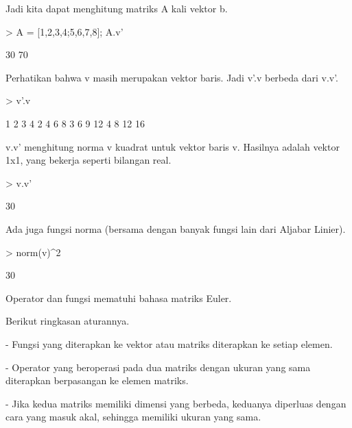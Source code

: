 \documentclass[a4paper,10pt]{article}
\begin{document}
\begin{eulernotebook}
\begin{eulercomment}
\begin{eulercomment}
\begin{eulercomment}
\begin{eulercomment}
\begin{eulercomment}
\begin{eulercomment}
\begin{eulercomment}
Jadi kita dapat menghitung matriks A kali vektor b.
\end{eulercomment}
\begin{eulerprompt}
> A = [1,2,3,4;5,6,7,8]; A.v'
\end{eulerprompt}
\begin{euleroutput}
             30 
             70 
\end{euleroutput}
\begin{eulercomment}
Perhatikan bahwa v masih merupakan vektor baris. Jadi v'.v berbeda
dari v.v'.
\end{eulercomment}
\begin{eulerprompt}
> v'.v
\end{eulerprompt}
\begin{euleroutput}
              1             2             3             4 
              2             4             6             8 
              3             6             9            12 
              4             8            12            16 
\end{euleroutput}
\begin{eulercomment}
v.v' menghitung norma v kuadrat untuk vektor baris v. Hasilnya adalah
vektor 1x1, yang bekerja seperti bilangan real.
\end{eulercomment}
\begin{eulerprompt}
> v.v'
\end{eulerprompt}
\begin{euleroutput}
  30
\end{euleroutput}
\begin{eulercomment}
Ada juga fungsi norma (bersama dengan banyak fungsi lain dari Aljabar
Linier).
\end{eulercomment}
\begin{eulerprompt}
> norm(v)^2
\end{eulerprompt}
\begin{euleroutput}
  30
\end{euleroutput}
\begin{eulercomment}
Operator dan fungsi mematuhi bahasa matriks Euler.

Berikut ringkasan aturannya.

- Fungsi yang diterapkan ke vektor atau matriks diterapkan ke setiap
elemen.

- Operator yang beroperasi pada dua matriks dengan ukuran yang sama
diterapkan berpasangan ke elemen matriks.

- Jika kedua matriks memiliki dimensi yang berbeda, keduanya diperluas
dengan cara yang masuk akal, sehingga memiliki ukuran yang sama.


\end{eulercomment}
\end{eulercomment}
\end{eulercomment}
\end{eulercomment}
\end{eulercomment}
\end{eulercomment}
\end{eulercomment}
\end{eulernotebook}
\end{document}
